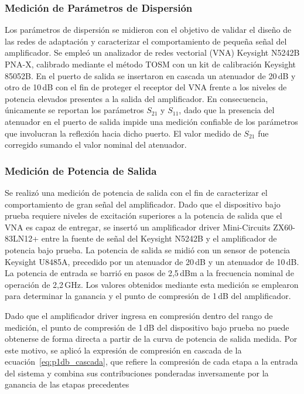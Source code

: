 \subsubsection{Medición de Parámetros de Dispersión}
Los parámetros de dispersión se midieron con el objetivo de validar el diseño de las redes de adaptación y caracterizar el comportamiento de pequeña señal del amplificador. Se empleó un analizador de redes vectorial (VNA) Keysight N5242B PNA-X, calibrado mediante el método TOSM con un kit de calibración Keysight 85052B. En el puerto de salida se insertaron en cascada un atenuador de 20\,dB y otro de 10\,dB con el fin de proteger el receptor del VNA frente a los niveles de potencia elevados presentes a la salida del amplificador. En consecuencia, únicamente se reportan los parámetros $S_{21}$ y $S_{11}$, dado que la presencia del atenuador en el puerto de salida impide una medición confiable de los parámetros que involucran la reflexión hacia dicho puerto. El valor medido de $S_{21}$ fue corregido sumando el valor nominal del atenuador.

\subsubsection{Medición de Potencia de Salida}
Se realizó una medición de potencia de salida con el fin de caracterizar el comportamiento de gran señal del amplificador. Dado que el dispositivo bajo prueba requiere niveles de excitación superiores a la potencia de salida que el VNA es capaz de entregar, se insertó un amplificador driver Mini-Circuits ZX60-83LN12+ entre la fuente de señal del Keysight N5242B y el amplificador de potencia bajo prueba. La potencia de salida se midió con un sensor de potencia Keysight U8485A, precedido por un atenuador de 20\,dB y un atenuador de 10\,dB. La potencia de entrada se barrió en pasos de 2,5\,dBm a la frecuencia nominal de operación de 2,2\,GHz. Los valores obtenidos mediante esta medición se emplearon para determinar la ganancia y el punto de compresión de 1\,dB del amplificador.

Dado que el amplificador driver ingresa en compresión dentro del rango de medición, el punto de compresión de 1\,dB del dispositivo bajo prueba no puede obtenerse de forma directa a partir de la curva de potencia de salida medida. Por este motivo, se aplicó la expresión de compresión en cascada de la ecuación~\eqref{eq:p1db_cascada}, que refiere la compresión de cada etapa a la entrada del sistema y combina sus contribuciones ponderadas inversamente por la ganancia de las etapas precedentes

